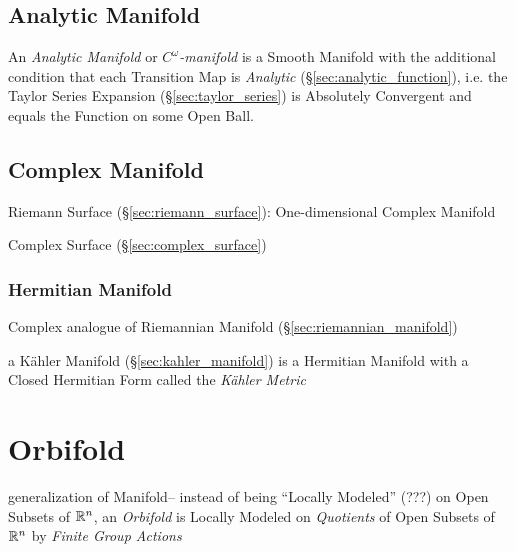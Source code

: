 \subsection{Analytic Manifold}\label{sec:analytic_manifold}

An \emph{Analytic Manifold} or \emph{$C^\omega$-manifold} is a Smooth Manifold
with the additional condition that each Transition Map is \emph{Analytic}
(\S\ref{sec:analytic_function}), i.e. the Taylor Series Expansion
(\S\ref{sec:taylor_series}) is Absolutely Convergent and equals the Function on
some Open Ball.



\subsection{Complex Manifold}\label{sec:complex_manifold}

Riemann Surface (\S\ref{sec:riemann_surface}): One-dimensional Complex
Manifold


Complex Surface (\S\ref{sec:complex_surface})



\subsubsection{Hermitian Manifold}\label{sec:hermitian_manifold}

Complex analogue of Riemannian Manifold (\S\ref{sec:riemannian_manifold})

a K\"ahler Manifold (\S\ref{sec:kahler_manifold}) is a Hermitian
Manifold with a Closed Hermitian Form called the \emph{K\"ahler
  Metric} %



\section{Orbifold}\label{sec:orbifold}

generalization of Manifold--
instead of being ``Locally Modeled'' (???) on Open Subsets of $\mathbb{R}^n$, an
\emph{Orbifold} is Locally Modeled on \emph{Quotients} of Open Subsets of
$\mathbb{R}^n$ by \emph{Finite Group Actions}

